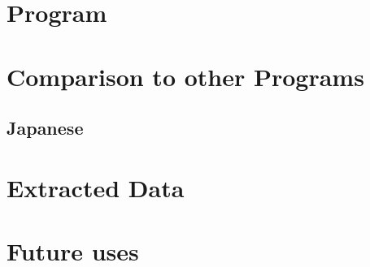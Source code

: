 \documentclass{article}
\begin{document}
\newpage
\section{Program}

 
\section{Comparison to other Programs}

\subsection{Japanese}

\section{Extracted Data}

\section{Future uses}



\end{document}
